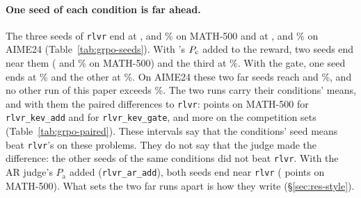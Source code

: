 \paragraph{One seed of each \kev{} condition is far ahead.} The three seeds of \texttt{rlvr} end at
,  and \% on MATH-500 and at
,  and \% on AIME24
(Table~\ref{tab:grpo-seeds}). With \kev{}'s $P_{\mathrm{c}}$ added to the reward, two seeds end near them
( and \% on MATH-500) and the third at \%. With
the gate, one seed ends at \% and the other at \%. On AIME24 these two
far seeds reach  and \%, and no other run of this paper exceeds
\%. The two runs carry their conditions' means, and with them the paired differences to
\texttt{rlvr}:   points on MATH-500 for
\texttt{rlvr\_kev\_add} and   for
\texttt{rlvr\_kev\_gate}, and more on the competition sets (Table~\ref{tab:grpo-paired}). These intervals say that the
conditions' seed means beat \texttt{rlvr}'s on these problems. They do not say that the judge made the difference: the
other seeds of the same conditions did not beat \texttt{rlvr}. With the AR judge's $P_{\mathrm{a}}$ added
(\texttt{rlvr\_ar\_add}), both seeds end near \texttt{rlvr} (
 points on MATH-500). What sets the two far runs apart is how they write
(\S\ref{sec:res-style}).

\begin{table}[t]
\centering\small

\caption{Paired differences to \texttt{rlvr}, in percentage points: per problem, each condition's seed mean, averaged
over problems, with a 95\% bootstrap interval over problems.}
\label{tab:grpo-paired}
\end{table}


